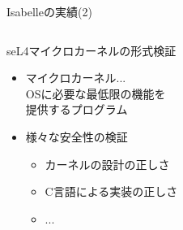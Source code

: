 \documentclass[17pt,aspectratio=169]{beamer}
\begin{document}
\begin{frame}{Isabelleの実績(2)}
    \vspace{3pt}
    \begin{columns}
        \begin{column}{0.75\textwidth} 

            seL4マイクロカーネルの形式検証
            \vspace{-3pt}
            {\small \begin{itemize}[itemsep=3pt]
                \item マイクロカーネル...\\
                    OSに必要な最低限の機能を\\
                    提供するプログラム
                \item 様々な安全性の検証
                \begin{itemize}[itemsep=3pt]
                    \item カーネルの設計の正しさ
                    \item C言語による実装の正しさ
                    \item ...
                \end{itemize}

                
            \end{itemize} } 
                

\end{column}
\end{columns}
\end{frame}
\end{document}
